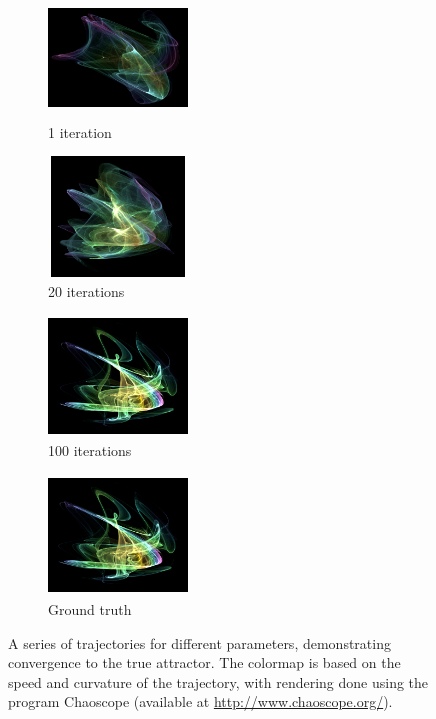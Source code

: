 \begin{figure}[t]
	\centering
	\begin{subfigure}[t]{0.24\textwidth}
		\centering
		\includegraphics[height=3.2cm,width=3.7cm]{chaos/compressed/first_iter_alt.png}
		\caption{1 iteration}
	\end{subfigure}
	\begin{subfigure}[t]{0.24\textwidth}
		\centering
		\tiny
		\includegraphics[height=3.2cm,width=3.7cm]{chaos/compressed/20_iter_alt.png}
		\caption{20 iterations}
	\end{subfigure}
	\begin{subfigure}[t]{0.24\textwidth}
		\centering
		\tiny
		\includegraphics[height=3.2cm,width=3.7cm]{chaos/compressed/100_iter_altj.png}
		\caption{100 iterations}
	\end{subfigure}
	\begin{subfigure}[t]{0.24\textwidth}
		\centering
		\tiny
		\includegraphics[height=3.2cm,width=3.7cm]{chaos/compressed/target_light.png}
		\caption{Ground truth}
	\end{subfigure}
	\caption{A series of trajectories for different parameters, demonstrating convergence to the true attractor.  The colormap is based on the speed and curvature of the trajectory, with rendering done using the program Chaoscope (available at {\href{http://www.chaoscope.org/}{http://www.chaoscope.org/}}). \label{fig:chaoscope}}
\end{figure}

